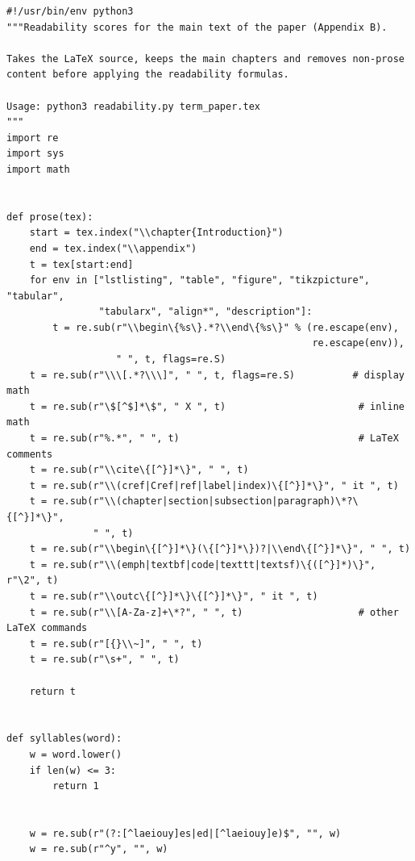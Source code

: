 \begin{lstlisting}[style=vspython]
#!/usr/bin/env python3
"""Readability scores for the main text of the paper (Appendix B).

Takes the LaTeX source, keeps the main chapters and removes non-prose
content before applying the readability formulas.

Usage: python3 readability.py term_paper.tex
"""
import re
import sys
import math


def prose(tex):
    start = tex.index("\\chapter{Introduction}")
    end = tex.index("\\appendix")
    t = tex[start:end]
    for env in ["lstlisting", "table", "figure", "tikzpicture", "tabular",
                "tabularx", "align*", "description"]:
        t = re.sub(r"\\begin\{%s\}.*?\\end\{%s\}" % (re.escape(env),
                                                     re.escape(env)),
                   " ", t, flags=re.S)
    t = re.sub(r"\\\[.*?\\\]", " ", t, flags=re.S)          # display math
    t = re.sub(r"\$[^$]*\$", " X ", t)                       # inline math
    t = re.sub(r"%.*", " ", t)                               # LaTeX comments
    t = re.sub(r"\\cite\{[^}]*\}", " ", t)
    t = re.sub(r"\\(cref|Cref|ref|label|index)\{[^}]*\}", " it ", t)
    t = re.sub(r"\\(chapter|section|subsection|paragraph)\*?\{[^}]*\}",
               " ", t)
    t = re.sub(r"\\begin\{[^}]*\}(\{[^}]*\})?|\\end\{[^}]*\}", " ", t)
    t = re.sub(r"\\(emph|textbf|code|texttt|textsf)\{([^}]*)\}", r"\2", t)
    t = re.sub(r"\\outc\{[^}]*\}\{[^}]*\}", " it ", t)
    t = re.sub(r"\\[A-Za-z]+\*?", " ", t)                    # other LaTeX commands
    t = re.sub(r"[{}\\~]", " ", t)
    t = re.sub(r"\s+", " ", t)

    return t


def syllables(word):
    w = word.lower()
    if len(w) <= 3:
        return 1

    
    w = re.sub(r"(?:[^laeiouy]es|ed|[^laeiouy]e)$", "", w)
    w = re.sub(r"^y", "", w)


\end{lstlisting}
